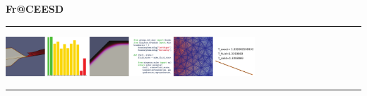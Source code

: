 \begin{frame}\frametitle{}

\vspace*{0.2in}

\hspace*{0.0in}\textrm{{\huge\bfseries\color{myOrange} Fr@CEESD}}

\vspace*{0.2in}
\hrule
\begin{center}
\includegraphics[width=0.7\textwidth]{Figures/coverart-sim.pdf}
\end{center}
\hrule

\vspace*{0.1in}
\hfill{}   %

\end{frame}
